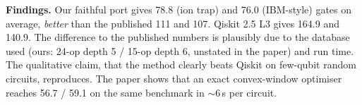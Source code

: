 \textbf{Findings.} Our faithful port gives 78.8 (ion trap) and 76.0 (IBM-style) gates on average, \emph{better} than the published
111 and 107. Qiskit 2.5 L3 gives 164.9 and 140.9. The difference to the published numbers is plausibly due to the database used
(ours: 24-op depth 5 / 15-op depth 6, unstated in the paper) and run time. The qualitative claim, that the method clearly beats Qiskit on
few-qubit random circuits, reproduces. The paper shows that an exact convex-window optimiser reaches 56.7 / 59.1 on the
same benchmark in $\sim$6\,s per circuit.
